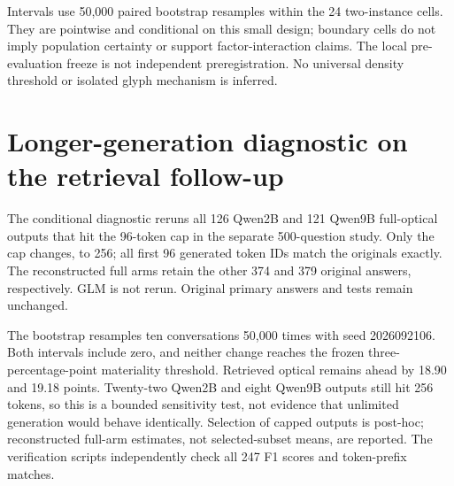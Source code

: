 \documentclass{article}
\begin{document}
\begin{table}[H]
  \centering\small
  \caption{Full-width minus original layout: paired EM differences and 95\% bootstrap intervals in percentage points. All losses are zero. Exact two-sided McNemar tests use Holm correction across the three readers.}
  \label{tab:layout-contrasts}
  
\end{table}

Intervals use 50,000 paired bootstrap resamples within the 24 two-instance cells. They are pointwise and conditional on this small design; boundary cells do not imply population certainty or support factor-interaction claims. The local pre-evaluation freeze is not independent preregistration. No universal density threshold or isolated glyph mechanism is inferred.

\section{Longer-generation diagnostic on the retrieval follow-up}
\label{app:cap}

The conditional diagnostic reruns all 126 Qwen2B and 121 Qwen9B full-optical outputs that hit the 96-token cap in the separate 500-question study. Only the cap changes, to 256; all first 96 generated token IDs match the originals exactly. The reconstructed full arms retain the other 374 and 379 original answers, respectively. GLM is not rerun. Original primary answers and tests remain unchanged.

\begin{table}[H]
  \centering\small
  \caption{Reconstructed 500-question full-optical conversation-macro F1. Changes and paired 95\% cluster intervals are in percentage points, unlike the F1 columns. Reruns include only the originally capped responses.}
  \label{tab:cap}
  
\end{table}

The bootstrap resamples ten conversations 50,000 times with seed 2026092106. Both intervals include zero, and neither change reaches the frozen three-percentage-point materiality threshold. Retrieved optical remains ahead by 18.90 and 19.18 points. Twenty-two Qwen2B and eight Qwen9B outputs still hit 256 tokens, so this is a bounded sensitivity test, not evidence that unlimited generation would behave identically. Selection of capped outputs is post-hoc; reconstructed full-arm estimates, not selected-subset means, are reported. The verification scripts independently check all 247 F1 scores and token-prefix matches.

\newpage

\end{document}
